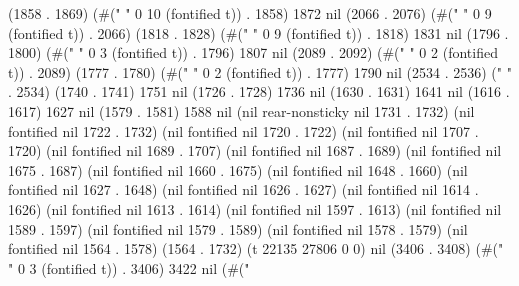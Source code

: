 (1858 . 1869) (#("          " 0 10 (fontified t)) . 1858) 1872 nil (2066 . 2076) (#("         " 0 9 (fontified t)) . 2066) (1818 . 1828) (#("         " 0 9 (fontified t)) . 1818) 1831 nil (1796 . 1800) (#("   " 0 3 (fontified t)) . 1796) 1807 nil (2089 . 2092) (#("  " 0 2 (fontified t)) . 2089) (1777 . 1780) (#("  " 0 2 (fontified t)) . 1777) 1790 nil (2534 . 2536) (" " . 2534) (1740 . 1741) 1751 nil (1726 . 1728) 1736 nil (1630 . 1631) 1641 nil (1616 . 1617) 1627 nil (1579 . 1581) 1588 nil (nil rear-nonsticky nil 1731 . 1732) (nil fontified nil 1722 . 1732) (nil fontified nil 1720 . 1722) (nil fontified nil 1707 . 1720) (nil fontified nil 1689 . 1707) (nil fontified nil 1687 . 1689) (nil fontified nil 1675 . 1687) (nil fontified nil 1660 . 1675) (nil fontified nil 1648 . 1660) (nil fontified nil 1627 . 1648) (nil fontified nil 1626 . 1627) (nil fontified nil 1614 . 1626) (nil fontified nil 1613 . 1614) (nil fontified nil 1597 . 1613) (nil fontified nil 1589 . 1597) (nil fontified nil 1579 . 1589) (nil fontified nil 1578 . 1579) (nil fontified nil 1564 . 1578) (1564 . 1732) (t 22135 27806 0 0) nil (3406 . 3408) (#("   " 0 3 (fontified t)) . 3406) 3422 nil (#("
